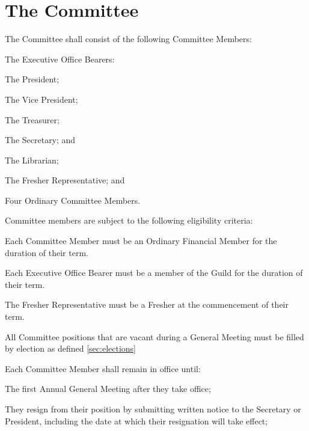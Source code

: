 \documentclass[a4paper]{article}
\begin{document}
\section{The Committee} \label{sec:committee}
\begin{myEnumerate}
    \item The Committee shall consist of the following Committee Members:
        \begin{myEnumerate}
            \item The Executive Office Bearers:
                \begin{myEnumerate}
                    \item The President;
                    \item The Vice President;
                    \item The Treasurer;
                    \item The Secretary; and
                    \item The Librarian;
                \end{myEnumerate}
            \item The Fresher Representative; and
            \item Four Ordinary Committee Members.
        \end{myEnumerate}
    \item Committee members are subject to the following eligibility criteria:
        \begin{myEnumerate}
            \item Each Committee Member must be an Ordinary Financial Member for the duration of their term.
            \item Each Executive Office Bearer must be a member of the Guild for the duration of their term.
            \item The Fresher Representative must be a Fresher at the commencement of their term.
        \end{myEnumerate}
    \item All Committee positions that are vacant during a General Meeting must be filled by election as defined \cref{sec:elections}
    \item \label{item:committee_term} Each Committee Member shall remain in office until: 
        \begin{myEnumerate}
            \item The first Annual General Meeting after they take office;
            \item They resign from their position by submitting written notice to the Secretary or President, including the date at which their resignation will take effect;

\end{myEnumerate}
\end{myEnumerate}
\end{document}
